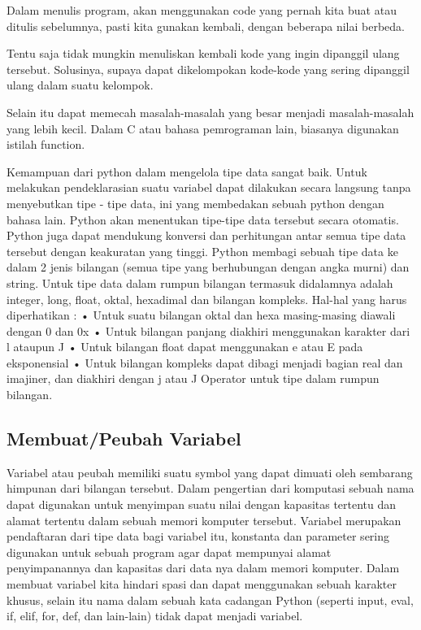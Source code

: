 Dalam menulis program, akan menggunakan code yang pernah kita  buat atau ditulis sebelumnya, pasti
kita gunakan kembali, dengan beberapa nilai berbeda.
 
Tentu saja tidak mungkin menuliskan kembali kode yang ingin dipanggil ulang tersebut.
Solusinya, supaya dapat dikelompokan kode-kode yang sering dipanggil ulang dalam suatu kelompok.

Selain itu dapat memecah masalah-masalah yang besar  menjadi masalah-masalah yang lebih kecil.
Dalam C atau bahasa pemrograman lain, biasanya digunakan istilah function.

Kemampuan dari python dalam mengelola tipe data sangat baik. Untuk melakukan pendeklarasian suatu variabel dapat dilakukan secara langsung tanpa menyebutkan tipe - tipe data, ini yang membedakan sebuah python dengan bahasa lain. Python akan menentukan tipe-tipe data tersebut secara otomatis. Python juga dapat mendukung konversi dan perhitungan antar semua tipe data tersebut dengan keakuratan yang tinggi. Python membagi sebuah tipe data ke dalam 2 jenis bilangan (semua tipe yang berhubungan dengan angka murni) dan string. Untuk tipe data dalam rumpun bilangan termasuk didalamnya adalah integer, long, float, oktal, hexadimal dan bilangan kompleks. Hal-hal yang harus diperhatikan :
•    Untuk suatu bilangan oktal dan hexa masing-masing diawali dengan 0 dan 0x
•    Untuk bilangan panjang diakhiri menggunakan karakter dari l ataupun J
•    Untuk bilangan float dapat menggunakan e atau E pada eksponensial
•    Untuk bilangan kompleks dapat dibagi menjadi bagian real dan imajiner, dan diakhiri dengan j atau J Operator untuk tipe dalam rumpun bilangan.\cite{utamipemrograman}

\subsection{Membuat/Peubah Variabel}
Variabel atau peubah memiliki suatu symbol yang dapat dimuati oleh sembarang himpunan dari bilangan tersebut. Dalam pengertian dari komputasi sebuah nama dapat digunakan untuk menyimpan suatu nilai dengan kapasitas tertentu dan alamat tertentu dalam sebuah memori komputer tersebut. Variabel merupakan pendaftaran dari tipe data bagi variabel itu, konstanta dan parameter sering digunakan untuk sebuah program agar dapat mempunyai alamat penyimpanannya dan kapasitas dari data nya dalam memori komputer. Dalam membuat variabel kita hindari spasi dan dapat menggunakan sebuah karakter khusus, selain itu nama dalam sebuah kata cadangan Python (seperti input, eval, if, elif, for, def, dan lain-lain) tidak dapat menjadi variabel.\cite{irfani2016bahan}

